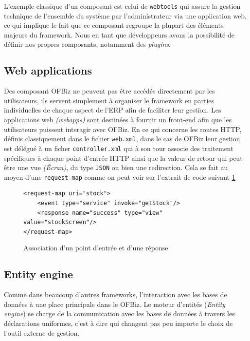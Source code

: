L'exemple classique d'un composant est celui de \verb|webtools| qui assure la gestion technique de l'ensemble du système par l'administrateur via une application web, ce qui implique le fait que ce composant regroupe la plupart des éléments majeurs du framework.
Nous en tant que développeurs avons la possibilité de définir nos propres composants, notamment des \emph{plugins}. 
  


\subsection{Web applications}
Des composant OFBiz ne peuvent pas être accédés directement par les utilisateurs, ils servent simplement à organiser le framework en parties individuelles de chaque aspect de l'ERP afin de faciliter leur gestion. Les applications web \emph{(webapps)} sont destinées à fournir un front-end afin que les utilisateurs puissent interagir avec OFBiz. En ce qui concerne les routes HTTP, définis classiquement dans le fichier \verb|web.xml|, dans le cas de OFBiz leur gestion est délégué à un ficher \verb|controller.xml| qui à son tour associe des traitement spécifiques à chaque point d'entrée HTTP ainsi que la valeur de retour qui peut être une vue \emph{(Écran)}, du type \verb|JSON| ou bien une redirection. Cela se fait au moyen d'une \verb|request-map| comme on peut voir sur l'extrait de code suivant \ref{reqmap}



\lstset{language=XML}
\begin{figure}
\begin{lstlisting}
<request-map uri="stock">
    <event type="service" invoke="getStock"/>
    <response name="success" type="view" value="stockScreen"/>
</request-map>
\end{lstlisting}
	\caption{Association d'un point d'entrée et d'une réponse}
\label{reqmap}
\end{figure}



\subsection{Entity engine}
Comme dans beaucoup d'autres frameworks, l'interaction avec les bases de données à une place principale dans le OFBiz. Le moteur d'entités (\emph{Entity engine}) se charge de la communication avec les  bases de données à travers les déclarations uniformes, c'est à dire qui changent pas peu importe le choix de l'outil externe de gestion.



